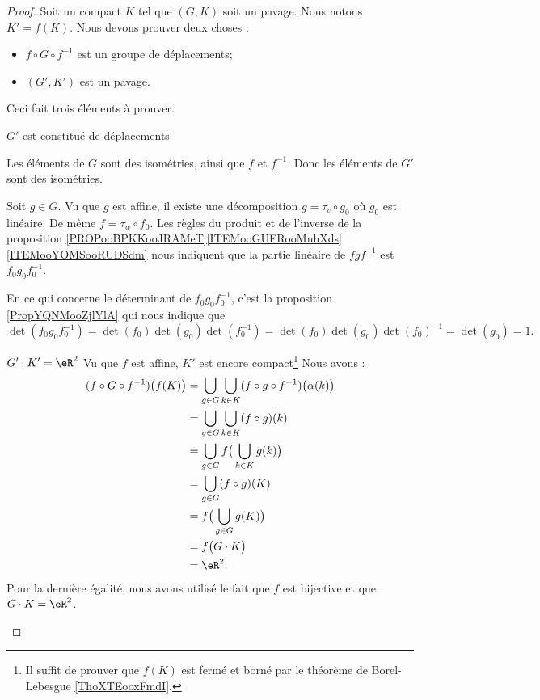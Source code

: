 \begin{proof}
    Soit un compact \( K\) tel que \( (G,K)\) soit un pavage. Nous notons \( K'=f(K)\). Nous devons prouver deux choses :
    \begin{itemize}
        \item \( f\circ G\circ f^{-1}\) est un groupe de déplacements;
        \item \( (G',K')\) est un pavage.
    \end{itemize}
    
    Ceci fait trois éléments à prouver.

    \begin{subproof}
        \item[\( G'\) est constitué de déplacements]

            Les éléments de \( G\) sont des isométries, ainsi que \( f\) et \( f^{-1}\). Donc les éléments de \( G'\) sont des isométries. 

            Soit \( g\in G\). Vu que \( g\) est affine, il existe une décomposition \( g=\tau_v\circ g_0\) où \( g_0\) est linéaire. De même \( f=\tau_w\circ f_0\). Les règles du produit et de l'inverse de la proposition \ref{PROPooBPKKooJRAMeT}\ref{ITEMooGUFRooMuhXds}\ref{ITEMooYOMSooRUDSdm} nous indiquent que la partie linéaire de \( fgf^{-1}\) est \( f_0g_0f_0^{-1}\).

            En ce qui concerne le déterminant de \( f_0g_0f_0^{-1}\), c'est la proposition \ref{PropYQNMooZjlYlA} qui nous indique que
            \begin{equation}
                \det(f_0g_0f_0^{-1})=\det(f_0)\det(g_0)\det(f_0^{-1})=\det(f_0)\det(g_0)\det(f_0)^{-1}=\det(g_0)=1.
            \end{equation}

        \item[\( G'\cdot K'=\eR^2\)]
            Vu que \( f\) est affine, \( K'\) est encore compact\footnote{Il suffit de prouver que \( f(K)\) est fermé et borné par le théorème de Borel-Lebesgue \ref{ThoXTEooxFmdI}.} Nous avons :
            \begin{subequations}
                \begin{align}
                    (f\circ G\circ f^{-1})\big( f(K) \big)&=\bigcup_{g\in G}\bigcup_{k\in K}(f\circ g\circ f^{-1})\big( \alpha(k) \big)\\
                        &=\bigcup_{g\in G}\bigcup_{k\in K}(f\circ g)(k)\\
                        &=\bigcup_{g\in G}f\big( \bigcup_{k\in K}g(k) \big)\\
                        &=\bigcup_{g\in G}(f\circ g)(K)\\
                        &=f\big( \bigcup_{g\in G}g(K) \big)\\
                        &=f\big( G\cdot K \big)\\
                        &=\eR^2.
                \end{align}
            \end{subequations}
            Pour la dernière égalité, nous avons utilisé le fait que \( f\) est bijective et que \( G\cdot K=\eR^2\).
                

\end{subproof}
\end{proof}
